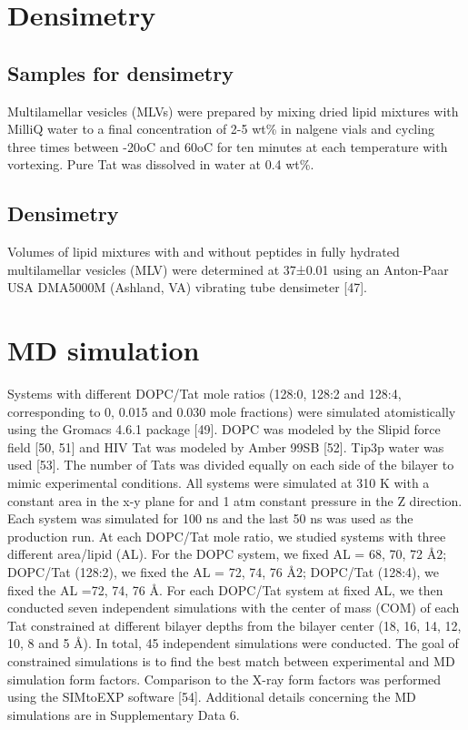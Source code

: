 \section{Densimetry}
\subsection{Samples for densimetry}
Multilamellar vesicles (MLVs) were prepared by mixing dried lipid mixtures with 
MilliQ
water to a final concentration of 2-5 wt\% in nalgene vials and cycling three 
times between -20oC
and 60oC for ten minutes at each temperature with vortexing. Pure Tat was 
dissolved in water
at 0.4 wt\%.

\subsection{Densimetry}
Volumes of lipid mixtures with and without peptides in fully hydrated multilamellar
vesicles (MLV) were determined at 37±0.01 \degC using an Anton-Paar USA DMA5000M
(Ashland, VA) vibrating tube densimeter [47].


\section{MD simulation}
Systems with different DOPC/Tat mole ratios (128:0, 128:2 and 128:4, corresponding to
0, 0.015 and 0.030 mole fractions) were simulated atomistically using the Gromacs 4.6.1
package [49]. DOPC was modeled by the Slipid force field [50, 51] and HIV Tat was modeled
by Amber 99SB [52]. Tip3p water was used [53]. The number of Tats was divided equally on
each side of the bilayer to mimic experimental conditions. All systems were simulated at 310 K
with a constant area in the x-y plane for and 1 atm constant pressure in the Z direction. Each
system was simulated for 100 ns and the last 50 ns was used as the production run.
At each DOPC/Tat mole ratio, we studied systems with three different area/lipid (AL).
For the DOPC system, we fixed AL = 68, 70, 72 Å2; DOPC/Tat (128:2), we fixed the AL = 72,
74, 76 Å2; DOPC/Tat (128:4), we fixed the AL =72, 74, 76 Å. For each DOPC/Tat system at
fixed AL, we then conducted seven independent simulations with the center of mass (COM) of
each Tat constrained at different bilayer depths from the bilayer center (18, 16, 14, 12, 10, 8 and
5 Å). In total, 45 independent simulations were conducted. The goal of constrained simulations
is to find the best match between experimental and MD simulation form factors. Comparison to
the X-ray form factors was performed using the SIMtoEXP software [54]. Additional details
concerning the MD simulations are in Supplementary Data 6.



